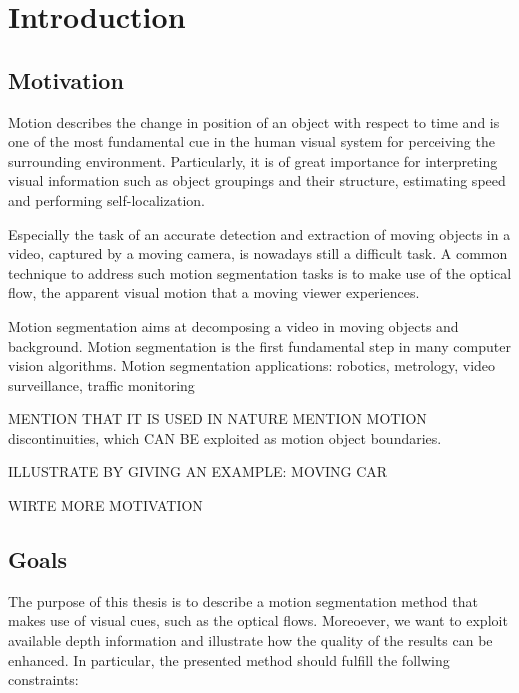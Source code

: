 \chapter{Introduction}
\section{Motivation}

Motion describes the change in position of an object with respect to time and is one of the most fundamental cue in the human visual system for perceiving the surrounding environment. Particularly, it is of great importance for interpreting visual information such as object groupings and their structure, estimating speed and performing self-localization.

Especially the task of an accurate detection and extraction of moving objects in a video, captured by a moving camera, is nowadays still a difficult task. A common technique to address such motion segmentation tasks is to make use of the optical flow, the apparent visual motion that a moving viewer experiences. 



Motion segmentation aims at decomposing a video in moving objects and background.
Motion segmentation is the first fundamental step in many computer vision algorithms.
Motion segmentation applications: robotics, metrology, video surveillance, traffic monitoring


MENTION THAT IT IS USED IN NATURE
MENTION MOTION discontinuities, which CAN BE exploited as motion object boundaries.


ILLUSTRATE BY GIVING AN EXAMPLE: MOVING CAR

WIRTE MORE MOTIVATION


\section{Goals}

The purpose of this thesis is to describe a motion segmentation method that makes use of visual cues, such as the optical flows. Moreoever, we want to exploit available depth information and illustrate how the quality of the results can be enhanced. In particular, the presented method should fulfill the follwing constraints:

